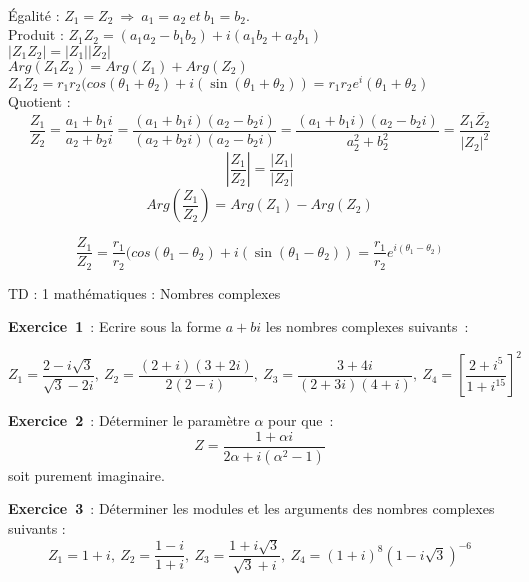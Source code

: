 \documentclass[12pt, a4paper]{article}
\begin{document}
\\
Égalité : $Z_{1} = Z_{2}~\Rightarrow~a_{1} = a_{2}~et~b_{1} = b_{2}$.
\\
Produit : ${Z_{1}Z_{2}}=(a_{1}a_{2}-b_{1}b_{2})+i(a_{1}b_{2}+a_{2}b_{1})$
\\
$|Z_{1}Z_{2}| = |Z_{1}| |Z_{2}|$
\\
$Arg(Z_{1}Z_{2}) = Arg(Z_{1}) +  Arg(Z_{2})$
\\
$Z_{1}Z_{2} = r_{1}r_{2} ( cos(\theta_{1}+\theta_{2})+i(\sin(\theta_{1}+\theta_{2})) 
= r_{1}r_{2}e^i(\theta_{1}+\theta_{2})$
\\
Quotient :
\\
\begin{equation*}
\frac{Z_{1}}{Z_{2}}
=\frac{a_{1}+b_{1}i}{a_{2}+b_{2}i}=\frac{(a_{1}+b_{1}i)( a_{2}-b_{2}i)}{(a_{2}+b_{2}i)(a_{2}-b_{2}i)}
=\frac{(a_{1}+b_{1}i)( a_{2}-b_{2}i)}{a_{2}^2+b_{2}^2} 
= \frac{Z_{1}\overline{Z_{2}}}{|Z_{2}|^2}
\end{equation*}
\begin{equation*}
|\frac{Z_{1}}{Z_{2}}| = \frac{|Z_{1}|}{|Z_{2}|}
\end{equation*}
\begin{equation*}
Arg(\frac{Z_{1}}{Z_{2}}) = Arg(Z_{1})-Arg(Z_{2})
\end{equation*}

\begin{equation*}
\frac{Z_{1}}{Z_{2}}= \frac{r_{1}}{r_{2}}( cos(\theta_{1}-\theta_{2})+i(\sin(\theta_{1}-\theta_{2})) = \frac{r_{1}}{r_{2}}e^{i(\theta_{1}-\theta_{2})}
\end{equation*}


\begin{center}
\large\sc 
TD : 1 mathématiques : Nombres complexes
\end{center}

{\bf Exercice~1}~: Ecrire sous la forme $a+bi$ les nombres complexes suivants~:

\begin{equation*}
Z_{1}=\frac{2-i\sqrt{3}}{\sqrt{3}-2i},~Z_{2}=\frac{(2+i)(3+2i)}{2(2-i)},~Z_{3} = \frac{3+4i}{(2+3i)(4+i)},~Z_{4}=[\frac{2+i^5}{1+i^{15}}]^2
\end{equation*}

{\bf Exercice~2}~: Déterminer le paramètre $\alpha$ pour que~:
\begin{equation*}
Z=\frac{1+\alpha i}{2\alpha + i(\alpha^2-1)}
\end{equation*}
soit purement imaginaire.

{\bf Exercice~3}~: Déterminer les modules et les arguments des nombres complexes suivants :
\begin{equation*}
Z_{1}=1+i,~Z_{2}=\frac{1-i}{1+i},~Z_{3}=\frac{1+i\sqrt{3}}{\sqrt{3}+i},~Z_{4}=(1+i)^8(1-i\sqrt{3})^{-6}
\end{equation*}
\end{document}
